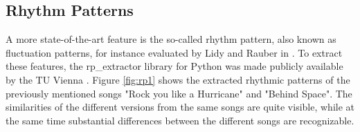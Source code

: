 \subsection{Rhythm Patterns}\label{flucpat}

A more state-of-the-art feature is the so-called rhythm pattern, also known as fluctuation patterns, for instance evaluated by Lidy and Rauber in \cite{rp1}. 
To extract these features, the rp\_extractor library for Python \cite{rp_extract} was made publicly available by the TU Vienna \cite{rp_extract2}. Figure \ref{fig:rp1} shows the extracted rhythmic patterns of the previously mentioned songs "Rock you like a Hurricane" and "Behind Space". The similarities of the different versions from the same songs are quite visible, while at the same time substantial differences between the different songs are recognizable.


